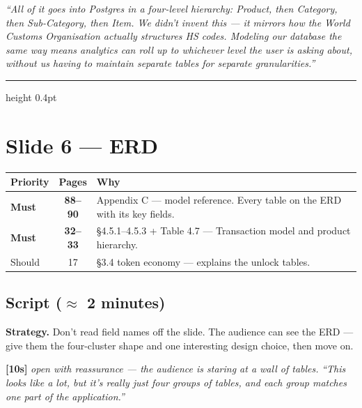 \documentclass[11pt,a4paper]{article}
\newcommand{\beat}[1]{\textcolor{accent}{\textbf{[#1]}}}
\newcommand{\stage}[1]{{\itshape\color{stageborder}#1}}
\begin{document}
\textit{``All of it goes into Postgres in a four-level hierarchy: Product, then Category, then Sub-Category, then Item. We didn't invent this --- it mirrors how the World Customs Organisation actually structures HS codes. Modeling our database the same way means analytics can roll up to whichever level the user is asking about, without us having to maintain separate tables for separate granularities.''}

\hrule height 0.4pt
\vspace{0.5em}

\section{Slide 6 --- ERD}

\begin{readbox}
\begin{tabularx}{\linewidth}{l c X}
\toprule
\textbf{Priority} & \textbf{Pages} & \textbf{Why} \\
\midrule
\textbf{Must}     & \textbf{88--90} & Appendix C --- model reference. Every table on the ERD with its key fields. \\
\textbf{Must}     & \textbf{32--33} & \S4.5.1--4.5.3 + Table 4.7 --- Transaction model and product hierarchy. \\
Should            & 17              & \S3.4 token economy --- explains the unlock tables. \\
\bottomrule
\end{tabularx}
\end{readbox}

\subsection*{Script ($\approx$ 2 minutes)}

\begin{stagebox}
\textbf{Strategy.} Don't read field names off the slide. The audience can see the ERD --- give them the four-cluster shape and one interesting design choice, then move on.
\end{stagebox}

\beat{10s} \stage{open with reassurance --- the audience is staring at a wall of tables.}
\textit{``This looks like a lot, but it's really just four groups of tables, and each group matches one part of the application.''}
\end{document}
